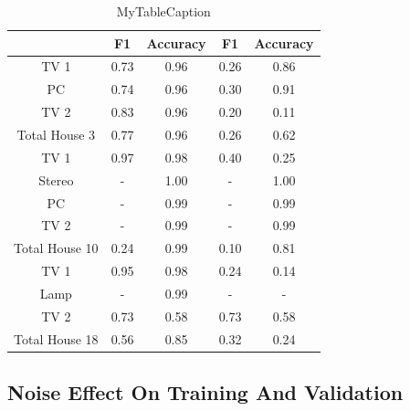\begin{table}[H]                             
\centering                                   
\begin{tabular}{|c|c|c|c|c|}                 
\hline                                       
 & F1 & Accuracy & F1 & Accuracy \\          
\hline                                       
TV 1 & 0.73 & 0.96 & 0.26 & 0.86 \\          
\hline                                       
PC & 0.74 & 0.96 & 0.30 & 0.91 \\            
\hline                                       
TV 2 & 0.83 & 0.96 & 0.20 & 0.11 \\          
\hline                                       
Total House 3 & 0.77 & 0.96 & 0.26 & 0.62 \\ 
\hline                                       
TV 1 & 0.97 & 0.98 & 0.40 & 0.25 \\          
\hline                                       
Stereo & - & 1.00 & - & 1.00 \\              
\hline                                       
PC & - & 0.99 & - & 0.99 \\                  
\hline                                       
TV 2 & - & 0.99 & - & 0.99 \\                
\hline                                       
Total House 10 & 0.24 & 0.99 & 0.10 & 0.81 \\
\hline                                       
TV 1 & 0.95 & 0.98 & 0.24 & 0.14 \\          
\hline                                       
Lamp & - & 0.99 & - & - \\                   
\hline                                       
TV 2 & 0.73 & 0.58 & 0.73 & 0.58 \\          
\hline                                       
Total House 18 & 0.56 & 0.85 & 0.32 & 0.24 \\
\hline                                       
\end{tabular}                                
\caption{MyTableCaption}                     
\label{table:Tab:SHGSIM}                     
\end{table} 

\subsection{Noise Effect On Training And Validation }

